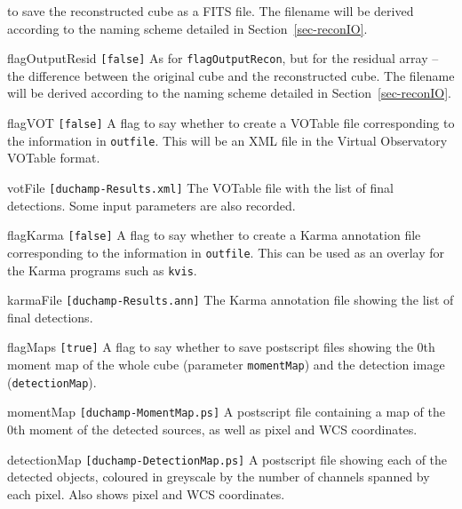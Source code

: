 \begin{entry}
  to save the reconstructed cube as a FITS file. The filename will be
  derived according to the naming scheme detailed in
  Section~\ref{sec-reconIO}.
\item[flagOutputResid \texttt{[false]}] As for
  \texttt{flagOutputRecon}, but for the residual array -- the
  difference between the original cube and the reconstructed cube. The
  filename will be derived according to the naming scheme detailed in
  Section~\ref{sec-reconIO}.
\item[flagVOT \texttt{[false]}] A flag to say whether to create a
  VOTable file corresponding to the information in
  \texttt{outfile}. This will be an XML file in the Virtual
  Observatory VOTable format.
\item[votFile \texttt{[duchamp-Results.xml]}] The VOTable file with
  the list of final detections. Some input parameters are also
  recorded.
\item[flagKarma \texttt{[false]}] A flag to say whether to create a
  Karma annotation file corresponding to the information in
  \texttt{outfile}. This can be used as an overlay for the Karma
  programs such as \texttt{kvis}.
\item[karmaFile \texttt{[duchamp-Results.ann]}] The Karma annotation
  file showing the list of final detections. 
\item[flagMaps \texttt{[true]}] A flag to say whether to save
  postscript files showing the 0th moment map of the whole cube
  (parameter \texttt{momentMap}) and the detection image
  (\texttt{detectionMap}).
\item[momentMap \texttt{[duchamp-MomentMap.ps]}] A postscript file
  containing a map of the 0th moment of the detected sources, as well
  as pixel and WCS coordinates.
\item[detectionMap \texttt{[duchamp-DetectionMap.ps]}] A postscript
  file showing each of the detected objects, coloured in greyscale by
  the number of channels spanned by each pixel. Also shows pixel and
  WCS coordinates.
\end{entry}


